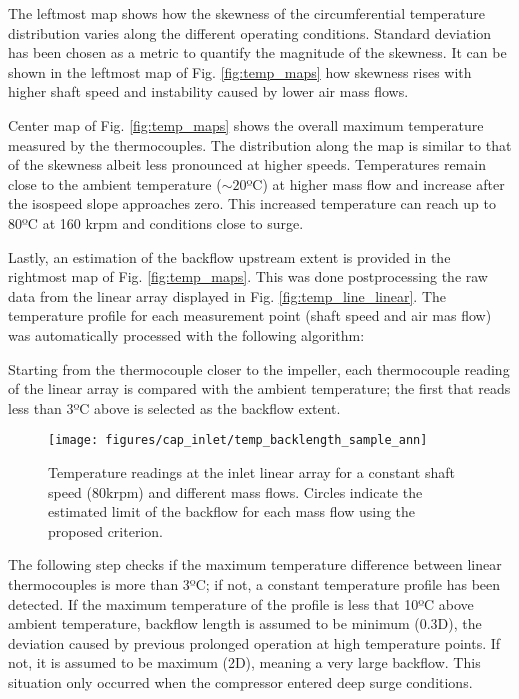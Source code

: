 The leftmost map shows how the skewness of the circumferential temperature distribution varies along the different operating conditions. Standard deviation has been chosen as a metric to quantify the magnitude of the skewness. It can be shown in the leftmost map of Fig. \ref{fig:temp_maps} how skewness rises with higher shaft speed and instability caused by lower air mass flows.

Center map of Fig. \ref{fig:temp_maps} shows the overall maximum temperature measured by the thermocouples. The distribution along the map is similar to that of the skewness albeit less pronounced at higher speeds. Temperatures remain close to the ambient temperature ($\sim 20$ºC) at higher mass flow and increase after the isospeed slope approaches zero. This increased temperature can reach up to 80ºC at 160 krpm and conditions close to surge.

Lastly, an estimation of the backflow upstream extent is provided in the rightmost map of Fig. \ref{fig:temp_maps}. This was done postprocessing the raw data from the linear array displayed in Fig. \ref{fig:temp_line_linear}. The temperature profile for each measurement point (shaft speed and air mas flow) was automatically processed with the following algorithm: 

Starting from the thermocouple closer to the impeller, each thermocouple reading of the linear array is compared with the ambient temperature; the first that reads less than 3ºC above is selected as the backflow extent.

\begin{figure}[b!]
\centering
\texttt{[image: figures/cap\_inlet/temp\_backlength\_sample\_ann]}
\caption{Temperature readings at the inlet linear array for a constant shaft speed (80krpm) and different mass flows. Circles indicate the estimated limit of the backflow for each mass flow using the proposed criterion.}
\label{fig:temp_backlength_sample}
\end{figure}

The following step checks if the maximum temperature difference between linear thermocouples is more than 3ºC; if not,  a constant temperature profile has been detected. If the maximum temperature of the profile is less that 10ºC above ambient temperature, backflow length is assumed to be minimum (0.3D), the deviation caused by previous prolonged operation at high temperature points. If not, it is assumed to be maximum (2D), meaning a very large backflow. This situation only occurred when the compressor entered deep surge conditions.

